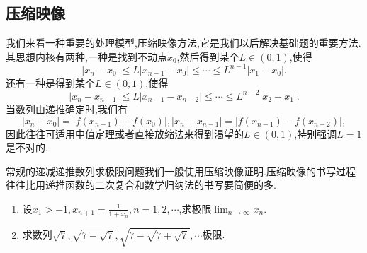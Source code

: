 \documentclass[lang=cn,newtx,10pt,scheme=chinese]{elegantbook}
\begin{document}
\subsection{压缩映像}
我们来看一种重要的处理模型,压缩映像方法,它是我们以后解决基础题的重要方法.其思想内核有两种,一种是找到不动点\(x_0\),然后得到某个\(L\in(0,1)\),使得
\[
|x_n - x_0|\leq L|x_{n - 1} - x_0|\leq\cdots\leq L^{n - 1}|x_1 - x_0|.
\]
还有一种是得到某个\(L\in(0,1)\),使得
\[
|x_n - x_{n - 1}|\leq L|x_{n - 1} - x_{n - 2}|\leq\cdots\leq L^{n - 2}|x_2 - x_1|.
\]
当数列由递推确定时,我们有
\[
|x_n - x_0| = |f(x_{n - 1}) - f(x_0)|,|x_n - x_{n - 1}| = |f(x_{n - 1}) - f(x_{n - 2})|,
\]
因此往往可适用中值定理或者直接放缩法来得到渴望的\(L\in(0,1)\),特别强调\(L = 1\)是不对的.
\begin{note}
   常规的递减递推数列求极限问题我们一般使用压缩映像证明.压缩映像的书写过程往往比用递推函数的二次复合和数学归纳法的书写要简便的多.
\end{note}
\begin{example}
\begin{enumerate}
   \item 设\(x_1 > - 1,x_{n + 1} = \frac{1}{1 + x_n},n = 1,2,\cdots\),求极限\(\lim_{n \to \infty} x_n\).
   \item 求数列\(\sqrt{7},\sqrt{7 - \sqrt{7}},\sqrt{7 - \sqrt{7 + \sqrt{7}}},\cdots\)极限.
\end{enumerate}
\end{example}
\end{document}
